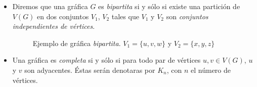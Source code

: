 \documentclass[12pt]{article}
\begin{document}
\begin{itemize}
  \newpage
  
\item Diremos que una gráfica $G$ es \textit{bipartita} si y sólo si existe una partición de $V(G)$ en dos conjuntos $V_1$, $V_2$ tales que $V_1$ y $V_2$ son \textit{conjuntos independientes de vértices}.

  \begin{figure}[h!]
    \centering
    \caption{Ejemplo de gráfica \textit{bipartita}. $V_1=\{u,v,w\}$ y $V_2=\{x,y,z\}$}    
  \end{figure}
  
\item Una gráfica es \textit{completa} si y sólo si para todo par de vértices $u,v\in V(G)$, $u$ y $v$ son adyacentes. Éstas serán denotaras por $K_n$, con $n$ el número de vértices.


\end{itemize}
\end{document}
